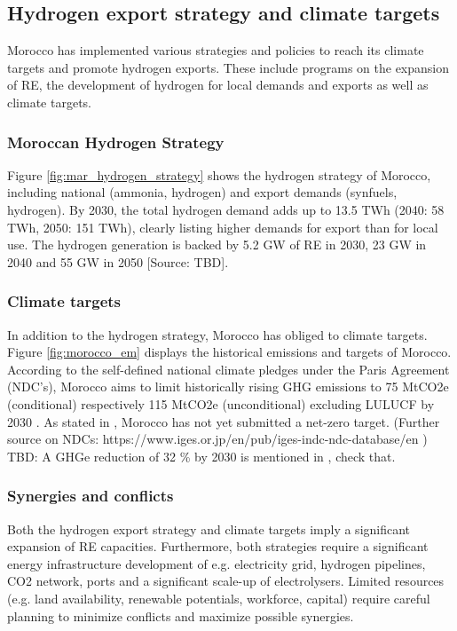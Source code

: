 \subsection{Hydrogen export strategy and climate targets}
\label{subsec:policyandtargets}
Morocco has implemented various strategies and policies to reach its climate targets and promote hydrogen exports. These include programs on the expansion of RE, the development of hydrogen for local demands and exports as well as climate targets.


\subsubsection{Moroccan Hydrogen Strategy}
Figure \ref{fig:mar_hydrogen_strategy} shows the hydrogen strategy of Morocco, including
national (ammonia, hydrogen) and export demands (synfuels, hydrogen).
By 2030, the total hydrogen demand adds up to 13.5 TWh (2040: 58 TWh, 2050: 151 TWh), 
clearly listing higher demands for export than for local use. The hydrogen generation is backed by 5.2 GW of RE in 2030, 23 GW in 2040 and 55 GW in 2050 [Source: TBD].

\subsubsection{Climate targets}
In addition to the hydrogen strategy, Morocco has obliged to climate targets.
Figure \ref{fig:morocco_em} displays the historical emissions and targets of Morocco.
According to the self-defined national climate pledges under the Paris Agreement (NDC's), Morocco aims to limit historically rising GHG emissions to 75 MtCO2e (conditional) respectively 115 MtCO2e (unconditional) excluding LULUCF by 2030 \cite{CAT2021}. 
As stated in \cite{CAT2021}, Morocco has not yet submitted a net-zero target. (Further source on NDCs: https://www.iges.or.jp/en/pub/iges-indc-ndc-database/en )
TBD: A GHGe reduction of 32 \% by 2030 is mentioned in \cite[5]{Boulakhbar2020}, check that.

\subsubsection{Synergies and conflicts}
Both the hydrogen export strategy and climate targets imply a significant expansion of RE capacities. Furthermore, both strategies require a significant energy infrastructure development of e.g. electricity grid, hydrogen pipelines, CO2 network, ports and a significant scale-up of electrolysers.
Limited resources (e.g. land availability, renewable potentials, workforce, capital) require careful planning to minimize conflicts and maximize possible synergies.



